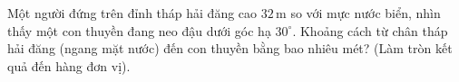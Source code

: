 \documentclass[12pt,a4paper]{article}
\begin{document}
\begin{ex}%
Một người đứng trên đỉnh tháp hải đăng cao $32\,\text{m}$ so với mực nước biển, nhìn thấy một con thuyền đang neo đậu dưới góc hạ $30^\circ$. Khoảng cách từ chân tháp hải đăng (ngang mặt nước) đến con thuyền bằng bao nhiêu mét? (Làm tròn kết quả đến hàng đơn vị).
\end{ex}
\end{document}
